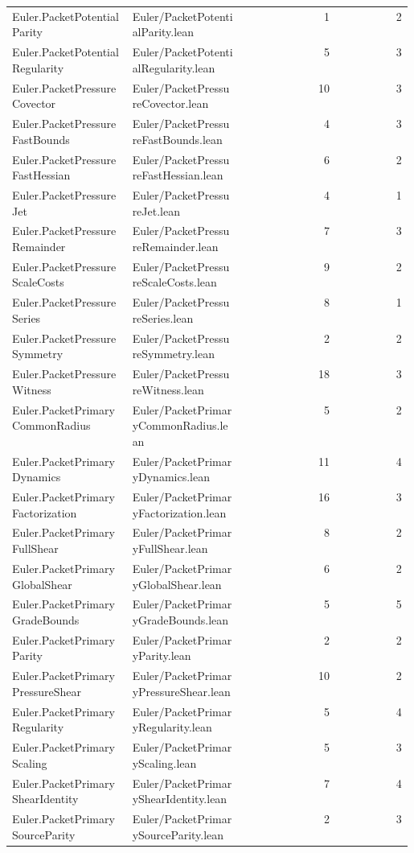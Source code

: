 \begin{longtable}{p{0.30\linewidth}p{0.28\linewidth}rr}
Euler.PacketPotentialParity & Euler/PacketPotentialParity.lean & 1 & 2\\
Euler.PacketPotentialRegularity & Euler/PacketPotentialRegularity.lean & 5 & 3\\
Euler.PacketPressureCovector & Euler/PacketPressureCovector.lean & 10 & 3\\
Euler.PacketPressureFastBounds & Euler/PacketPressureFastBounds.lean & 4 & 3\\
Euler.PacketPressureFastHessian & Euler/PacketPressureFastHessian.lean & 6 & 2\\
Euler.PacketPressureJet & Euler/PacketPressureJet.lean & 4 & 1\\
Euler.PacketPressureRemainder & Euler/PacketPressureRemainder.lean & 7 & 3\\
Euler.PacketPressureScaleCosts & Euler/PacketPressureScaleCosts.lean & 9 & 2\\
Euler.PacketPressureSeries & Euler/PacketPressureSeries.lean & 8 & 1\\
Euler.PacketPressureSymmetry & Euler/PacketPressureSymmetry.lean & 2 & 2\\
Euler.PacketPressureWitness & Euler/PacketPressureWitness.lean & 18 & 3\\
Euler.PacketPrimaryCommonRadius & Euler/PacketPrimaryCommonRadius.lean & 5 & 2\\
Euler.PacketPrimaryDynamics & Euler/PacketPrimaryDynamics.lean & 11 & 4\\
Euler.PacketPrimaryFactorization & Euler/PacketPrimaryFactorization.lean & 16 & 3\\
Euler.PacketPrimaryFullShear & Euler/PacketPrimaryFullShear.lean & 8 & 2\\
Euler.PacketPrimaryGlobalShear & Euler/PacketPrimaryGlobalShear.lean & 6 & 2\\
Euler.PacketPrimaryGradeBounds & Euler/PacketPrimaryGradeBounds.lean & 5 & 5\\
Euler.PacketPrimaryParity & Euler/PacketPrimaryParity.lean & 2 & 2\\
Euler.PacketPrimaryPressureShear & Euler/PacketPrimaryPressureShear.lean & 10 & 2\\
Euler.PacketPrimaryRegularity & Euler/PacketPrimaryRegularity.lean & 5 & 4\\
Euler.PacketPrimaryScaling & Euler/PacketPrimaryScaling.lean & 5 & 3\\
Euler.PacketPrimaryShearIdentity & Euler/PacketPrimaryShearIdentity.lean & 7 & 4\\
Euler.PacketPrimarySourceParity & Euler/PacketPrimarySourceParity.lean & 2 & 3\\

\end{longtable}
